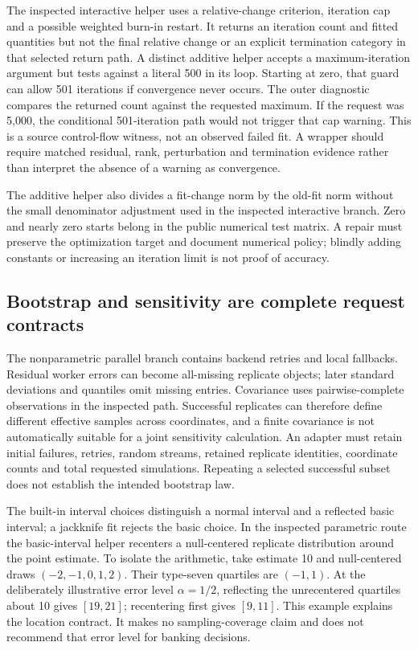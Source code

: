 The inspected interactive helper uses a relative-change criterion,
iteration cap and a possible weighted burn-in restart. It returns an
iteration count and fitted quantities but not the final relative change
or an explicit termination category in that selected return path. A
distinct additive helper accepts a maximum-iteration argument but tests
against a literal 500 in its loop. Starting at zero, that guard can allow
501 iterations if convergence never occurs. The outer diagnostic compares
the returned count against the requested maximum. If the request was
5,000, the conditional 501-iteration path would not trigger that cap
warning. This is a source control-flow witness, not an observed failed
fit. A wrapper should require matched residual, rank, perturbation and
termination evidence rather than interpret the absence of a warning as
convergence.~\citep{exec24_fect_source,exec24_fect_choice}

The additive helper also divides a fit-change norm by the old-fit norm
without the small denominator adjustment used in the inspected
interactive branch. Zero and nearly zero starts belong in the public
numerical test matrix. A repair must preserve the optimization target and
document numerical policy; blindly adding constants or increasing an
iteration limit is not proof of accuracy.~\citep{exec24_fect_source,exec24_fect_choice}

\subsection{Bootstrap and sensitivity are complete request contracts}
The nonparametric parallel branch contains backend retries and local
fallbacks. Residual worker errors can become all-missing replicate objects;
later standard deviations and quantiles omit missing entries. Covariance
uses pairwise-complete observations in the inspected path. Successful
replicates can therefore define different effective samples across
coordinates, and a finite covariance is not automatically suitable for a
joint sensitivity calculation. An adapter must retain initial failures,
retries, random streams, retained replicate identities, coordinate counts
and total requested simulations. Repeating a selected successful subset
does not establish the intended bootstrap law.~\citep{exec24_fect_source}

The built-in interval choices distinguish a normal interval and a reflected
basic interval; a jackknife fit rejects the basic choice. In the inspected
parametric route the basic-interval helper recenters a null-centered
replicate distribution around the point estimate. To isolate the arithmetic,
take estimate 10 and null-centered draws $(-2,-1,0,1,2)$. Their type-seven
quartiles are $(-1,1)$. At the deliberately illustrative error level
$\alpha=1/2$, reflecting the unrecentered quartiles about 10 gives
$[19,21]$; recentering first gives $[9,11]$. This example explains the
location contract. It makes no sampling-coverage claim and does not
recommend that error level for banking decisions.
\citep{exec24_fect_source,exec24_fect_choice}

